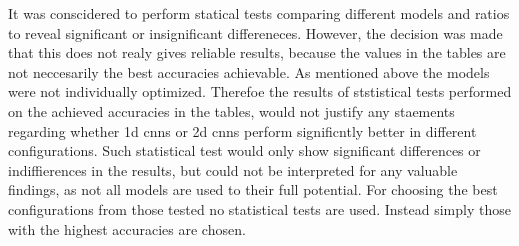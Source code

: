 
 
It was conscidered to perform statical tests comparing different models and ratios to reveal significant or insignificant differeneces. However, the decision was made that this does not realy gives reliable results, because the values in the tables  are not neccesarily the best accuracies achievable. As mentioned above the models were not individually optimized. Therefoe the results of ststistical tests performed on the achieved accuracies in the tables, would not justify any staements regarding whether 1d cnns or 2d cnns perform significntly better in different configurations. Such statistical test would only show significant differences or indiffierences in the results, but could not be interpreted for any valuable findings, as not all models are used to their full potential. For choosing the best configurations from those tested no statistical tests are used. Instead simply those with the highest accuracies are chosen.

